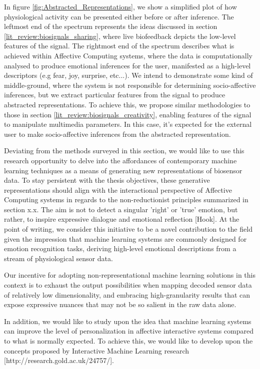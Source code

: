 In figure \ref{fig:Abstracted_Representations}, we show a simplified plot of how physiological activity can be presented either before or after inference. The leftmost end of the spectrum represents the ideas discussed in section \ref{lit_review:biosignals_sharing}, where live biofeedback depicts the low-level features of the signal. The rightmost end of the spectrum describes what is achieved within Affective Computing systems, where the data is computationally analysed to produce emotional inferences for the user, manifested as a high-level descriptors (e.g fear, joy, surprise, etc...). We intend to demonstrate some kind of middle-ground, where the system is not responsible for determining socio-affective inferences, but we extract particular features from the signal to produce abstracted representations. To achieve this, we propose similar methodologies to those in section \ref{lit_review:biosignals_creativity}, enabling features of the signal to manipulate multimedia parameters. In this case, it's expected for the external user to make socio-affective inferences from the abstracted representation.

Deviating from the methods surveyed in this section, we would like to use this research opportunity to delve into the affordances of contemporary machine learning techniques as a means of generating new representations of biosensor data.  To stay persistent with the thesis objectives, these generative representations should align with the interactional perspective of Affective Computing systems in regards to the non-reductionist principles summarized in section x.x. The aim is not to detect a singular 'right' or 'true' emotion, but rather, to inspire expressive dialogue and emotional reflection [Hook]. At the point of writing, we consider this initiative to be a novel contribution to the field given the impression that machine learning systems are commonly designed for emotion recognition tasks, deriving high-level emotional descriptions from a stream of physiological sensor data.

Our incentive for adopting non-representational machine learning solutions in this context is to exhaust the output possibilities when mapping decoded sensor data of relatively low dimensionality, and embracing high-granularity results that can expose expressive nuances that may not be so salient in the raw data alone.

In addition, we would like to study upon the idea that machine learning systems can improve the level of personalization in affective interactive systems compared to what is normally expected. To achieve this, we would like to develop upon the concepts proposed by Interactive Machine Learning research [http://research.gold.ac.uk/24757/].

